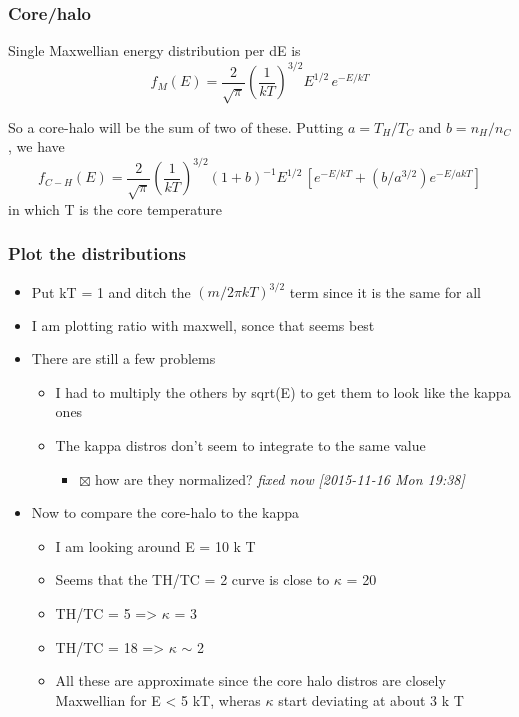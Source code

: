 \documentclass[11pt]{article}
\begin{document}
\subsubsection{Core/halo}
\label{sec:orgheadline21}
Single Maxwellian energy distribution per dE is 
\[
f_{M}(E) = \frac{2}{\sqrt{\pi}}
\left(\frac{1}{k T}\right)^{3/2} E^{1/2}\, e^{-E/k T}
\]

So a core-halo will be the sum of two of these.  Putting \(a = T_{H} / T_{C}\) and \(b = n_{H}/n_{C}\), we have
\[
f_{C-H}(E) = \frac{2}{\sqrt{\pi}}
\left(\frac{1}{k T}\right)^{3/2} (1 + b)^{-1} E^{1/2}\,
\left[e^{-E/kT} + (b / a^{3/2}) e^{-E/akT}\right]
\]
in which T is the core temperature

\subsubsection{Plot the distributions}
\label{sec:orgheadline22}
\begin{itemize}
\item Put kT = 1 and ditch the \((m / 2 \pi k T)^{3/2}\) term since it is the same for all
\item I am plotting ratio with maxwell, sonce that seems best
\item There are still a few problems
\begin{itemize}
\item I had to multiply the others by sqrt(E) to get them to look like the kappa ones
\item The kappa distros don't seem to integrate to the same value
\begin{itemize}
\item $\boxtimes$ how are they normalized? \emph{fixed now} \textit{[2015-11-16 Mon 19:38]}
\end{itemize}
\end{itemize}
\item Now to compare the core-halo to the kappa
\begin{itemize}
\item I am looking around E = 10 k T
\item Seems that the TH/TC = 2 curve is close to \(\kappa\) = 20
\item TH/TC = 5 => \(\kappa\) = 3
\item TH/TC = 18 => \(\kappa\) \(\sim\) 2
\item All these are approximate since the core halo distros are closely Maxwellian for E < 5 kT, wheras \(\kappa\) start deviating at about 3 k T
\end{itemize}
\end{itemize}
\end{document}
